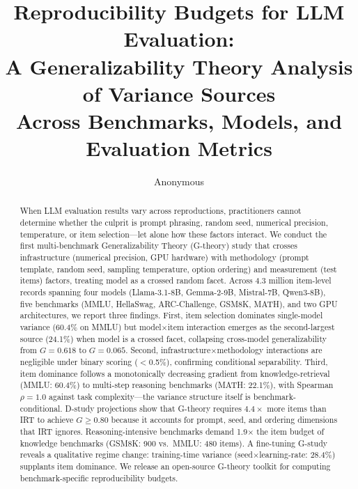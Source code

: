 \documentclass[letterpaper]{article}
\title{Reproducibility Budgets for LLM Evaluation:\\A Generalizability Theory Analysis of Variance Sources\\Across Benchmarks, Models, and Evaluation Metrics}
\author{Anonymous}
\date{}
\newcommand{\gcoeff}{\ensuremath{G}}
\newcommand{\pct}{\%}
\begin{document}
\maketitle

\begin{abstract}
When LLM evaluation results vary across reproductions, practitioners cannot determine whether the culprit is prompt phrasing, random seed, numerical precision, temperature, or item selection---let alone how these factors interact.
We conduct the first multi-benchmark Generalizability Theory (G-theory) study that crosses infrastructure (numerical precision, GPU hardware) with methodology (prompt template, random seed, sampling temperature, option ordering) and measurement (test items) factors, treating model as a crossed random facet.
Across 4.3 million item-level records spanning four models (Llama-3.1-8B, Gemma-2-9B, Mistral-7B, Qwen3-8B), five benchmarks (MMLU, HellaSwag, ARC-Challenge, GSM8K, MATH), and two GPU architectures, we report three findings.
First, item selection dominates single-model variance (60.4\pct{} on MMLU) but model$\times$item interaction emerges as the second-largest source (24.1\pct{}) when model is a crossed facet, collapsing cross-model generalizability from $\gcoeff{}=0.618$ to $\gcoeff{}=0.065$.
Second, infrastructure$\times$methodology interactions are negligible under binary scoring ($<$0.5\pct{}), confirming conditional separability.
Third, item dominance follows a monotonically decreasing gradient from knowledge-retrieval (MMLU: 60.4\pct{}) to multi-step reasoning benchmarks (MATH: 22.1\pct{}), with Spearman $\rho=1.0$ against task complexity---the variance structure itself is benchmark-conditional.
D-study projections show that G-theory requires $4.4\times$ more items than IRT to achieve $\gcoeff{}\geq0.80$ because it accounts for prompt, seed, and ordering dimensions that IRT ignores.
Reasoning-intensive benchmarks demand 1.9$\times$ the item budget of knowledge benchmarks (GSM8K: 900 vs.\ MMLU: 480 items).
A fine-tuning G-study reveals a qualitative regime change: training-time variance (seed$\times$learning-rate: 28.4\pct{}) supplants item dominance.
We release an open-source G-theory toolkit for computing benchmark-specific reproducibility budgets.
\end{abstract}

\end{document}
